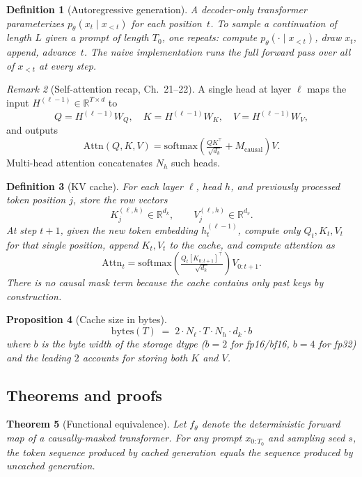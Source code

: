 \documentclass[11pt]{article}
\newtheorem{theorem}{Theorem}[section]
\newtheorem{definition}[theorem]{Definition}
\newtheorem{proposition}[theorem]{Proposition}
\theoremstyle{remark}
\newtheorem{remark}[theorem]{Remark}
\begin{document}
\begin{definition}[Autoregressive generation]
A decoder-only transformer parameterizes $p_\theta(x_t \mid x_{<t})$ for each position~$t$. To sample a continuation of length $L$ given a prompt of length $T_0$, one repeats: compute $p_\theta(\cdot \mid x_{<t})$, draw $x_t$, append, advance~$t$. The naive implementation runs the full forward pass over all of $x_{<t}$ at every step.
\end{definition}

\begin{remark}[Self-attention recap, Ch.~21--22]
A single head at layer $\ell$ maps the input $H^{(\ell-1)} \in \mathbb{R}^{T \times d}$ to
\[ Q = H^{(\ell-1)} W_Q, \quad K = H^{(\ell-1)} W_K, \quad V = H^{(\ell-1)} W_V, \]
and outputs
\[ \mathrm{Attn}(Q, K, V) = \mathrm{softmax}\!\left(\tfrac{Q K^\top}{\sqrt{d_k}} + M_{\mathrm{causal}}\right) V. \]
Multi-head attention concatenates $N_h$ such heads.
\end{remark}

\begin{definition}[KV cache]
For each layer $\ell$, head $h$, and previously processed token position $j$, store the row vectors
\[ K_j^{(\ell, h)} \in \mathbb{R}^{d_k}, \qquad V_j^{(\ell, h)} \in \mathbb{R}^{d_v}. \]
At step $t+1$, given the new token embedding $h_t^{(\ell-1)}$, compute only $Q_t, K_t, V_t$ for that single position, append $K_t, V_t$ to the cache, and compute attention as
\[ \mathrm{Attn}_t = \mathrm{softmax}\!\left(\tfrac{Q_t [K_{0:t+1}]^\top}{\sqrt{d_k}}\right) V_{0:t+1}. \]
There is no causal mask term because the cache contains only past keys by construction.
\end{definition}

\begin{proposition}[Cache size in bytes]
\[ \boxed{\;\mathrm{bytes}(T) \;=\; 2 \cdot N_\ell \cdot T \cdot N_h \cdot d_k \cdot b\;} \]
where $b$ is the byte width of the storage dtype ($b=2$ for fp16/bf16, $b=4$ for fp32) and the leading $2$ accounts for storing both $K$ and $V$.
\end{proposition}

\subsection*{Theorems and proofs}

\begin{theorem}[Functional equivalence]\label{thm:equiv}
Let $f_\theta$ denote the deterministic forward map of a causally-masked transformer. For any prompt $x_{0:T_0}$ and sampling seed $s$, the token sequence produced by cached generation equals the sequence produced by uncached generation.
\end{theorem}
\end{document}
